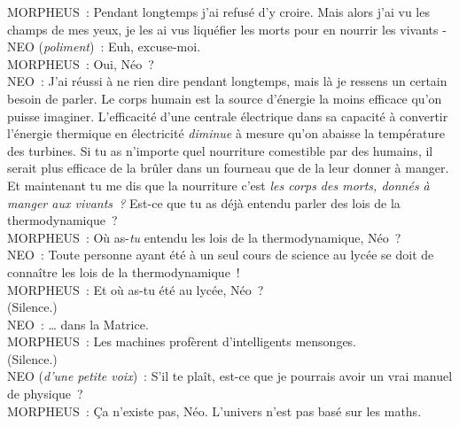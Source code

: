 \begin{playdialog}
MORPHEUS~: Pendant longtemps j'ai refusé d'y croire. Mais alors j'ai vu les champs de mes yeux, je les ai vus liquéfier les morts pour en nourrir les vivants -\\

NEO (\emph{poliment})~: Euh, excuse-moi.\\

MORPHEUS~: Oui, Néo~?\\

NEO~: J'ai réussi à ne rien dire pendant longtemps, mais là je ressens un certain besoin de parler. Le corps humain est la source d'énergie la moins efficace qu'on puisse imaginer. L'efficacité d'une centrale électrique dans sa capacité à convertir l'énergie thermique en électricité \emph{diminue} à mesure qu'on abaisse la température des turbines. Si tu as n'importe quel nourriture comestible par des humains, il serait plus efficace de la brûler dans un fourneau que de la leur donner à manger. Et maintenant tu me dis que la nourriture c'est \emph{les corps des morts, donnés à manger aux vivants~?} Est-ce que tu as déjà entendu parler des lois de la thermodynamique~?\\

MORPHEUS~: Où as-\emph{tu} entendu les lois de la thermodynamique, Néo~?\\

NEO~: Toute personne ayant été à un seul cours de science au lycée se doit de connaître les lois de la thermodynamique~!\\

MORPHEUS~: Et où as-tu été au lycée, Néo~?\\

(Silence.)\\

NEO~: … dans la Matrice.\\

MORPHEUS~: Les machines profèrent d'intelligents mensonges.\\

(Silence.)\\

NEO (\emph{d'une petite voix})~: S'il te plaît, est-ce que je pourrais avoir un vrai manuel de physique~?\\

MORPHEUS~: Ça n'existe pas, Néo. L'univers n'est pas basé sur les maths.\\ \end{playdialog}

